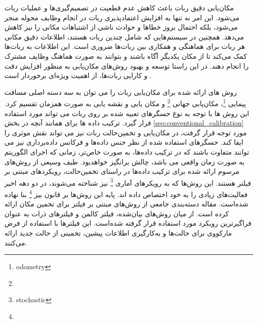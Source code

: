 مکان‌یابی دقیق ربات باعث کاهش عدم قطعیت در تصمیم‌گیری‌ها و عملیات ربات می‌شود. این امر نه تنها به افزایش اعتمادپذیری ربات در انجام وظایف محوله منجر می‌شود، بلکه احتمال بروز خطاها و حوادث ناشی از اشتباهات مکانی را نیز کاهش می‌دهد. همچنین در سیستم‌هایی که شامل چندین ربات هستند، اطلاعات دقیق مکانی هر ربات برای هماهنگی و همکاری بین ربات‌ها ضروری است. این اطلاعات به ربات‌ها کمک می‌کند تا از مکان یکدیگر آگاه باشند و بتوانند به صورت هماهنگ وظایف مشترک را انجام دهند. در این راستا توسعه و بهبود روش‌های مکان‌یابی به منظور افزایش دقت و کارایی ربات‌ها، از اهمیت ویژه‌ای برخوردار است
\cite{aragues2011multi}.


روش های ارائه شده برای مکان‌یابی ربات را می توان به سه دسته اصلی مسافت پیمایی
\footnote{odometry}،
مکان‌یابی جهانی
\footnote{}
و مکان یابی و نقشه یابی به صورت همزمان تقسیم کرد. این روش ها با توجه به نوع حسگرهای تعبیه شده بر روی ربات می تواند مورد استفاده قرار گیرد. ترکیب داده ها برای همانند آنچه در بخش
\ref{seq:conventional_calibration}
مورد توجه قرار گرفت، در مکان‌یابی و تخمین‌حالت ربات نیز می تواند نقش موثری را ایفا کند. حسگر‌های استفاده شده از نظر جنس داده‌ها و فرکانس داده‌برداری نیز می توانند متفاوت باشند که در ترکیب داده‌ها، به صورت خاص‌تر، زمانی که اجرای الگوریتم به صورت زمان واقعی می باشد، چالش برانگیز خواهد‌بود. طیف وسیعی از روش‌های مرسوم ارائه شده برای ترکیب داده‌ها در راستای تخمین‌حالت، رویکردهای مبتنی بر فیلتر هستند. این روش‌ها که به رویکرهای آماری 
\footnote{stochastic}
نیز شناخته می‌شوند، در دو دهه اخیر فعالیت‌های زیادی را به خود اختصاص داده اند. پایه این روش‌ها بر قانون بیز
\footnote{}
بنا نهاده شده‌است. مقاله
\cite{panigrahi2022localization} 
دسته‌بندی جامعی از روش‌های مبتنی بر فیلتر برای تخمین مکان ارائه کرده است. از میان روش‌های بیان‌شده، فیلتر کالمن و فیلترهای ذرات به عنوان فراگیرترین رویکرد مورد استفاده قرار گرفته شده‌است. این فیلترها با استفاده از فرض مارکووی برای حالت‌ها و به‌کار‌گیری اطلاعات پیشین، تخمینی از حالت جدید ارائه می‌کنند. 

